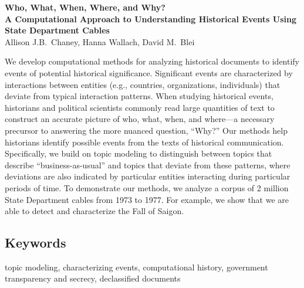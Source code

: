 \documentclass[12pt]{article}
\begin{document}
\begin{center}
  {\large \textbf{Who, What, When, Where, and Why?
  \\ 
  A Computational Approach to
Understanding Historical Events Using State Department Cables}}\\
  \bigskip
  {Allison J.B.~Chaney,
  Hanna Wallach,
  David M.~Blei
  }
\end{center}


We develop computational methods for analyzing historical documents to
identify events of potential historical significance. Significant
events are characterized by interactions between entities (e.g.,
countries, organizations, individuals) that deviate from typical
interaction patterns. When studying historical events, historians and
political scientists commonly read large quantities of text to
construct an accurate picture of who, what, when, and where---a
necessary precursor to answering the more nuanced question, ``Why?'' Our
methods help historians identify possible events from the texts of
historical communication. Specifically, we build on topic modeling to
distinguish between topics that describe ``business-as-usual'' and
topics that deviate from these patterns, where deviations are also
indicated by particular entities interacting during particular periods
of time. To demonstrate our methods, we analyze a corpus of 2 million
State Department cables from 1973 to 1977. For example, we show that
we are able to detect and characterize the Fall of Saigon.


\subsection*{Keywords}
topic modeling, characterizing events, computational history,
government transparency and secrecy, declassified documents
\end{document}
